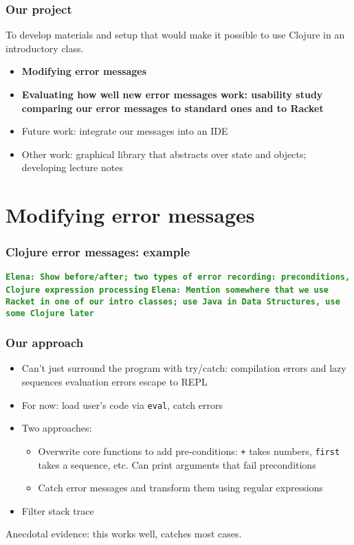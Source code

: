 \documentclass{beamer}
\newcommand{\comment}[1]{{\bf \tt  {#1}}}
\newcommand{\emcomment}[1]{\textcolor{ForestGreen}{\comment{Elena: {#1}}}}
\begin{document}
\begin{frame}
\frametitle{ Our project}
To develop materials and setup that would make it possible to use Clojure in an introductory class. 
\begin{itemize}
\item {\bf Modifying error messages}
\item {\bf Evaluating how well new error messages work: usability study comparing our error messages to standard ones and to Racket}
\item Future work: integrate our messages into an IDE
\item Other work: graphical library that abstracts over state and objects; developing lecture notes 
\end{itemize}
\end{frame}

\section{Modifying error messages}

\begin{frame}
\frametitle{ Clojure error messages: example}
\emcomment{Show before/after; two types of error recording: preconditions, Clojure expression processing}
\emcomment{Mention somewhere that we use Racket in one of our intro classes; use Java in Data Structures, use some Clojure later}
\end{frame}

\begin{frame}
\frametitle{Our approach}
\begin{itemize}
\item Can't just surround the program with try/catch: compilation errors and lazy sequences evaluation errors escape to REPL
\item For now: load user's code via {\tt eval}, catch errors
\item Two approaches:
	\begin{itemize}
	\item Overwrite core functions to add pre-conditions: {\tt +} takes numbers, {\tt first} takes a sequence, etc. Can print 		arguments that fail preconditions
	\item Catch error messages and transform them using regular expressions
	\end{itemize}
\item Filter stack trace
\end{itemize}
Anecdotal evidence: this works well, catches most cases. 
\end{frame}
\end{document}
